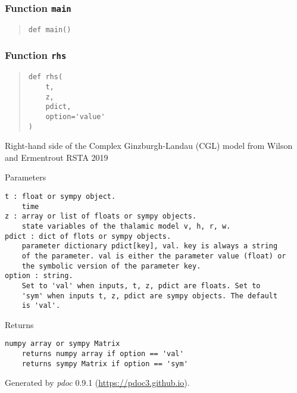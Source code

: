 \documentclass[
  english,
  a4paper,
  oneside]{article}
\begin{document}
\hypertarget{CGL.main}{%
\subsubsection{\texorpdfstring{Function
\texttt{main}}{Function main}}\label{CGL.main}}

\begin{quote}
\begin{verbatim}
def main()
\end{verbatim}
\end{quote}

\hypertarget{CGL.rhs}{%
\subsubsection{\texorpdfstring{Function
\texttt{rhs}}{Function rhs}}\label{CGL.rhs}}

\begin{quote}
\begin{verbatim}
def rhs(
    t,
    z,
    pdict,
    option='value'
)
\end{verbatim}
\end{quote}

Right-hand side of the Complex Ginzburgh-Landau (CGL) model from Wilson
and Ermentrout RSTA 2019

Parameters

\begin{verbatim}
t : float or sympy object.
    time
z : array or list of floats or sympy objects.
    state variables of the thalamic model v, h, r, w.
pdict : dict of flots or sympy objects.
    parameter dictionary pdict[key], val. key is always a string
    of the parameter. val is either the parameter value (float) or 
    the symbolic version of the parameter key.
option : string.
    Set to 'val' when inputs, t, z, pdict are floats. Set to
    'sym' when inputs t, z, pdict are sympy objects. The default
    is 'val'.
\end{verbatim}

Returns

\begin{verbatim}
numpy array or sympy Matrix
    returns numpy array if option == 'val'
    returns sympy Matrix if option == 'sym'
\end{verbatim}

Generated by \emph{pdoc} 0.9.1 (\url{https://pdoc3.github.io}).
\end{document}
